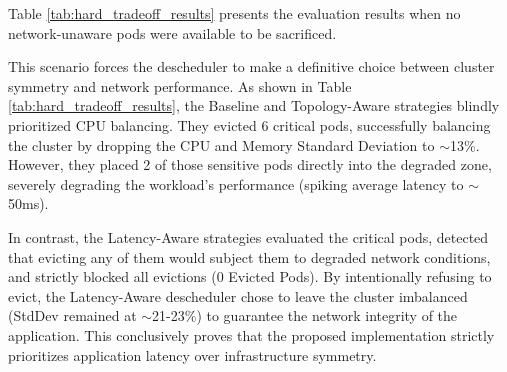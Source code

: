 Table \ref{tab:hard_tradeoff_results} presents the evaluation results when no network-unaware pods were available to be sacrificed.
\begin{table}[tbp]
    \centering
    \caption{Descheduler Performance: The "Hard Tradeoff" Scenario (No Network-Unaware Pods)}
    \label{tab:hard_tradeoff_results}
\end{table}

This scenario forces the descheduler to make a definitive choice between cluster symmetry and network performance. As shown in Table \ref{tab:hard_tradeoff_results}, the Baseline and Topology-Aware strategies blindly prioritized CPU balancing. They evicted 6 critical pods, successfully balancing the cluster by dropping the CPU and Memory Standard Deviation to $\sim$13\%. However, they placed 2 of those sensitive pods directly into the degraded zone, severely degrading the workload's performance (spiking average latency to $\sim$50ms).

In contrast, the Latency-Aware strategies evaluated the critical pods, detected that evicting any of them would subject them to degraded network conditions, and strictly blocked all evictions (0 Evicted Pods). By intentionally refusing to evict, the Latency-Aware descheduler chose to leave the cluster imbalanced (StdDev remained at $\sim$21-23\%) to guarantee the network integrity of the application. This conclusively proves that the proposed implementation strictly prioritizes application latency over infrastructure symmetry.

